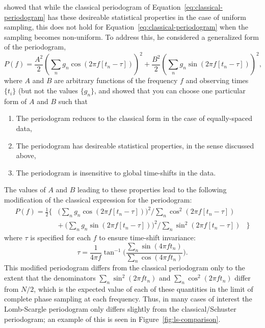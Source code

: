 \documentclass[preprint]{aastex}
\newcommand{\fig}[1]{Figure~\ref{fig:#1}}
\newcommand{\Eq}[1]{Equation~\ref{eq:#1}}
\newcommand{\eq}[1]{\Eq{#1}}
\newcommand{\eqlabel}[1]{\label{eq:#1}}
\begin{document}
\citet{Scargle82} showed that while the classical periodogram of
\eq{classical-periodogram} has these desireable statistical properties
in the case of uniform sampling, this does not hold for
\eq{classical-periodogram} when the sampling becomes non-uniform.
To address this, he considered a generalized form of the periodogram,
\begin{equation}
  P(f) = \frac{A^2}{2}\left(\sum_n g_n \cos(2\pi f [t_n-\tau])\right)^2
       + \frac{B^2}{2} \left(\sum_n g_n \sin(2\pi f [t_n-\tau])\right)^2,
\end{equation}
where $A$ and $B$ are arbitrary functions of the frequency $f$ and
observing times $\{t_i\}$ (but not the values $\{g_n\}$, and showed
that you can choose one particular form of $A$ and $B$ such that
\begin{enumerate}
  \item The periodogram reduces to the classical form in the case of equally-spaced data,
  \item The periodogram has desireable statistical properties, in the sense discussed above,
  \item The periodogram is insensitive to global time-shifts in the data.
\end{enumerate}
The values of $A$ and $B$ leading to these properties lead to the following
modification of the classical expression for the periodogram:
\begin{eqnarray}
  P(f) =
  \frac{1}{2} \Bigg\{ &
  \bigg(\sum_n g_n \cos(2\pi f [t_n-\tau])\bigg)^2 \bigg/
  \sum_n \cos^2(2\pi f [t_n-\tau]) &\nonumber\\
  & + ~ \bigg(\sum_n g_n \sin(2\pi f [t_n-\tau])\bigg)^2 \bigg/
  \sum_n \sin^2(2\pi f [t_n-\tau]) & \Bigg\}
  \eqlabel{lomb-scargle-periodogram}
\end{eqnarray}
where $\tau$ is specified for each $f$ to ensure time-shift invariance:
\begin{equation}
  \tau = \frac{1}{4\pi f}\tan^{-1}\Bigg(
  \frac{\sum_n \sin(4\pi f t_n)}{\sum_n \cos(4\pi f t_n)}\Bigg).
  \eqlabel{tau-def}
\end{equation}
This modified periodogram differs from the classical periodogram only to
the extent that the denominators $\sum_n \sin^2(2\pi f t_n)$ and
$\sum_n \cos^2(2\pi f t_n)$ differ from $N/2$, which is the expected value of
each of these quantities in the limit of complete phase sampling at each
frequency.
Thus, in many cases of interest the Lomb-Scargle periodogram only differs
slightly from the classical/Schuster periodogram; an example of this is seen
in \fig{ls-comparison}.
\end{document}
